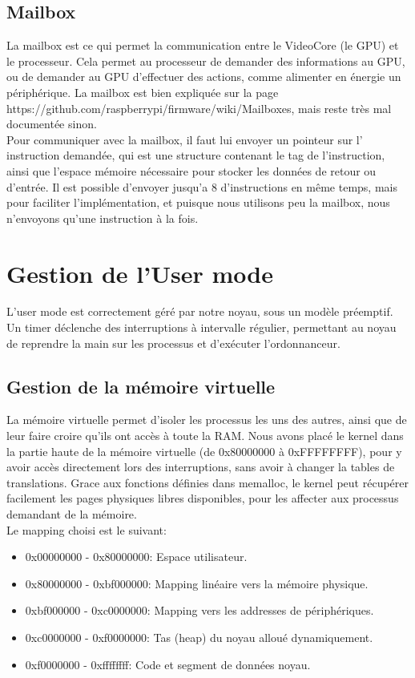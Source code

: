 \documentclass[a4paper]{article}
\begin{document}
\subsection{Mailbox}

La mailbox est ce qui permet la communication entre le VideoCore (le GPU) et le
processeur. Cela permet au processeur de demander des informations au GPU, ou
de demander au GPU d'effectuer des actions, comme alimenter en énergie un
périphérique. La mailbox est bien expliquée sur la page
https://github.com/raspberrypi/firmware/wiki/Mailboxes, mais reste très mal
documentée sinon.\\

Pour communiquer avec la mailbox, il faut lui envoyer un pointeur sur l'
instruction demandée, qui est une structure contenant le tag de
l'instruction, ainsi que l'espace mémoire nécessaire pour stocker les données de
retour ou d'entrée. Il est possible d'envoyer jusqu'a 8 d'instructions en même
temps, mais pour faciliter l'implémentation, et puisque nous utilisons peu la
mailbox, nous n'envoyons qu'une instruction à la fois.

\section{Gestion de l'User mode}
L'user mode est correctement géré par notre noyau, sous un modèle préemptif.
Un timer déclenche des interruptions à intervalle régulier, permettant au noyau
de reprendre la main sur les processus et d'exécuter l'ordonnanceur.

\subsection{Gestion de la mémoire virtuelle}
La mémoire virtuelle permet d'isoler les processus les uns des autres, ainsi que
de leur faire croire qu'ils ont accès à toute la RAM. Nous avons placé le kernel
dans la partie haute de la mémoire virtuelle (de 0x80000000 à 0xFFFFFFFF), pour
y avoir accès directement lors des interruptions, sans avoir à changer la tables
de translations. Grace aux fonctions définies dans memalloc, le kernel peut
récupérer facilement les pages physiques libres disponibles, pour les affecter
aux processus demandant de la mémoire. \\
Le mapping choisi est le suivant:
\begin{itemize}
	\item 0x00000000 - 0x80000000: Espace utilisateur.
	\item 0x80000000 - 0xbf000000: Mapping linéaire vers la mémoire physique.
	\item 0xbf000000 - 0xc0000000: Mapping vers les addresses de périphériques.
	\item 0xc0000000 - 0xf0000000: Tas (heap) du noyau alloué dynamiquement.
	\item 0xf0000000 - 0xffffffff: Code et segment de données noyau.
\end{itemize}
\end{document}
